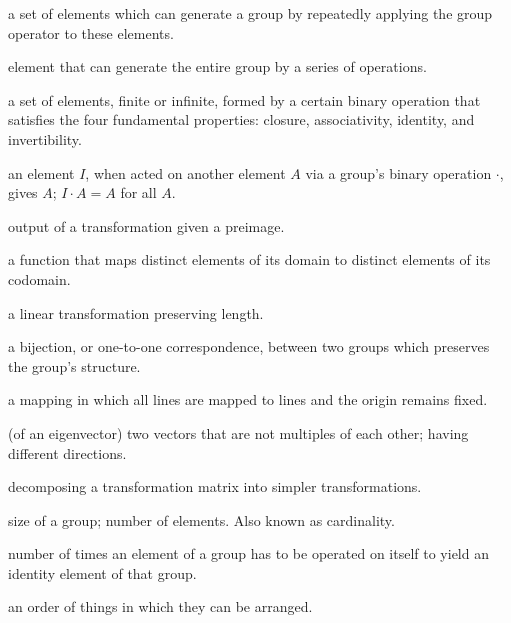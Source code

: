 \documentclass[../textbook.tex]{subfiles}
\begin{document}
\begin{description}[align=left]
\item[generating set] a set of elements which can generate a group by repeatedly applying the group operator to these elements.

\item[generator] element that can generate the entire group by a series of operations.

\item[group] a set of elements, finite or infinite, formed by a certain binary operation that satisfies the four fundamental properties: closure, associativity, identity, and invertibility.

\item[identity element] an element $I$, when acted on another element $A$ via a group's binary operation $\cdot$, gives $A$; $I\cdot A = A$ for all $A$.

\item[image] output of a transformation given a preimage.

\item[injective function] a function that maps distinct elements of its domain to distinct elements of its codomain.

\item[isometry] a linear transformation preserving length.

\item[isomorphism] a bijection, or one-to-one correspondence, between two groups which preserves the group's structure.

\item[linear mapping] a mapping in which all lines are mapped to lines and the origin remains fixed.

\item[linearly independent] (of an eigenvector) two vectors that are not multiples of each other; having different directions.

\item[matrix decomposition] decomposing a transformation matrix into simpler transformations.

\item[order] size of a group; number of elements. Also known as cardinality.

\item[period] number of times an element of a group has to be operated on itself to yield an identity element of that group.

\item[permutation] an order of things in which they can be arranged.


\end{description}
\end{document}
